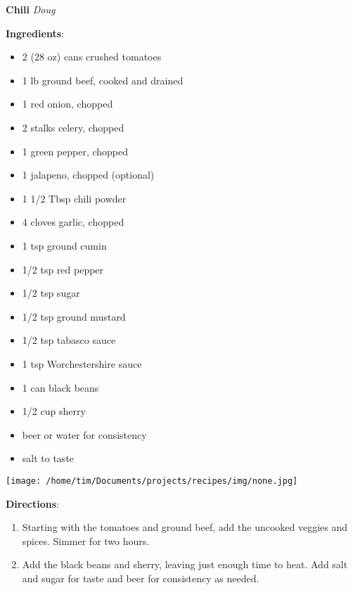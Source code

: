 \documentclass[11pt, twoside, openany]{book}
\begin{document}
\noindent\begin{minipage}[t]{\linewidth}%
{\Large\textbf{Chili}} \label{chili}\hfill\textit{Doug}\\
\noindent\begin{minipage}[t]{0.78\linewidth}%
\textbf{Ingredients}:\vspace{-3mm}
\begin{multicols}{2}
\begin{itemize}\setlength\itemsep{-1mm}
\item 2 (28 oz) cans crushed tomatoes
\item 1 lb ground beef, cooked and drained
\item 1 red onion, chopped
\item 2 stalks celery, chopped
\item 1 green pepper, chopped
\item 1 jalapeno, chopped (optional)
\item 1 1/2 Tbsp chili powder
\item 4 cloves garlic, chopped
\item 1 tsp ground cumin
\item 1/2 tsp red pepper
\item 1/2 tsp sugar
\item 1/2 tsp ground mustard
\item 1/2 tsp tabasco sauce
\item 1 tsp Worchestershire sauce
\item 1 can black beans
\item 1/2 cup sherry
\item beer or water for consistency
\item salt to taste
\end{itemize}
\end{multicols}
\end{minipage}
\noindent\begin{minipage}[t]{0.18\linewidth}
\centering \strut\vspace*{-\baselineskip}\newline
\texttt{[image: /home/tim/Documents/projects/recipes/img/none.jpg]}\\
\end{minipage}\vspace{3mm}
\textbf{Directions}:
\vspace{-3mm}\begin{enumerate}\setlength\itemsep{-1mm}
\item Starting with the tomatoes and ground beef, add the uncooked veggies and spices. Simmer for two hours.
\item Add the black beans and sherry, leaving just enough time to heat. Add salt and sugar for taste and beer for consistency as needed.
\end{enumerate}
\end{minipage}\vspace{8mm}
\end{document}
